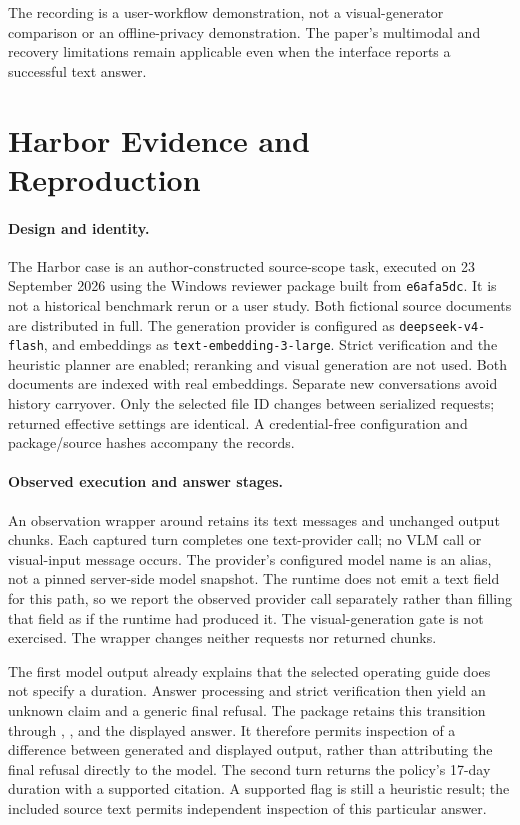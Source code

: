 The recording is a user-workflow demonstration, not a visual-generator comparison or an offline-privacy demonstration. The paper's multimodal and recovery limitations remain applicable even when the interface reports a successful text answer.


\section{Harbor Evidence and Reproduction}
\label{app:case}
\paragraph{Design and identity.}
The Harbor case is an author-constructed source-scope task, executed on 23 September 2026 using the Windows reviewer package built from \texttt{e6afa5dc}. It is not a historical benchmark rerun or a user study. Both fictional source documents are distributed in full. The generation provider is configured as \texttt{deepseek-v4-flash}, and embeddings as \texttt{text-embedding-3-large}. Strict verification and the heuristic planner are enabled; reranking and visual generation are not used. Both documents are indexed with real embeddings. Separate new conversations avoid history carryover. Only the selected file ID changes between serialized requests; returned effective settings are identical. A credential-free configuration and package/source hashes accompany the records.

\paragraph{Observed execution and answer stages.}
An observation wrapper around  retains its text messages and unchanged output chunks. Each captured turn completes one text-provider call; no VLM call or visual-input message occurs. The provider's configured model name is an alias, not a pinned server-side model snapshot. The runtime does not emit a text  field for this path, so we report the observed provider call separately rather than filling that field as if the runtime had produced it. The visual-generation gate is not exercised. The wrapper changes neither requests nor returned chunks.

The first model output already explains that the selected operating guide does not specify a duration. Answer processing and strict verification then yield an unknown claim and a generic final refusal. The package retains this transition through , , and the displayed answer. It therefore permits inspection of a difference between generated and displayed output, rather than attributing the final refusal directly to the model. The second turn returns the policy's 17-day duration with a supported citation. A supported flag is still a heuristic result; the included source text permits independent inspection of this particular answer.

